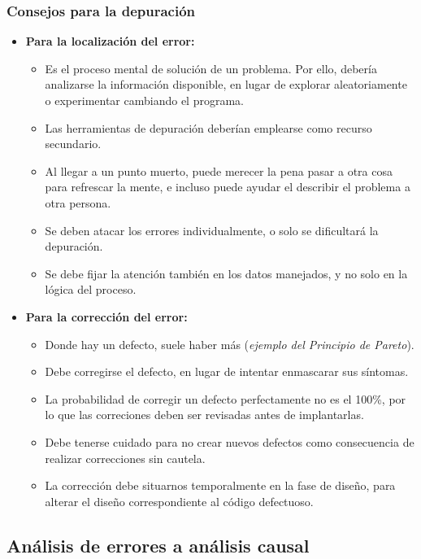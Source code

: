 \subsubsection{Consejos para la depuración}

\begin{itemize}
    \item \textbf{Para la localización del error:}
    \begin{itemize}
        \item Es el proceso mental de solución de un problema. Por ello, debería analizarse la información disponible, en lugar de explorar aleatoriamente o experimentar cambiando el programa.
        \item Las herramientas de depuración deberían emplearse como recurso secundario.
        \item Al llegar a un punto muerto, puede merecer la pena pasar a otra cosa para refrescar la mente, e incluso puede ayudar el describir el problema a otra persona.
        \item Se deben atacar los errores individualmente, o solo se dificultará la depuración.
        \item Se debe fijar la atención también en los datos manejados, y no solo en la lógica del proceso.
    \end{itemize}

    \item \textbf{Para la corrección del error:}
    \begin{itemize}
        \item Donde hay un defecto, suele haber más (\textit{ejemplo del Principio de Pareto}).
        \item Debe corregirse el defecto, en lugar de intentar enmascarar sus síntomas.
        \item La probabilidad de corregir un defecto perfectamente no es el 100\%, por lo que las correciones deben ser revisadas antes de implantarlas.
        \item Debe tenerse cuidado para no crear nuevos defectos como consecuencia de realizar correcciones sin cautela.
        \item La corrección debe situarnos temporalmente en la fase de diseño, para alterar el diseño correspondiente al código defectuoso.
    \end{itemize}
\end{itemize}

\subsection{Análisis de errores a análisis causal}


